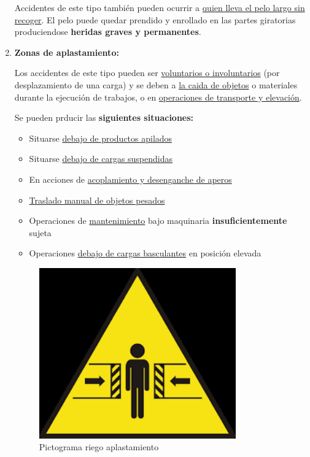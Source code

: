 \documentclass[a4paper,12pt,oneside]{book}
\begin{document}
\begin{enumerate}
Accidentes de este tipo también pueden ocurrir a \uline{quien lleva el pelo largo sin
recoger}. El pelo puede quedar prendido y enrollado en las partes giratorias
produciendose \textbf{heridas graves y permanentes}.

\item \textbf{Zonas de aplastamiento:}
\label{sec:orgdf52b36}

Los accidentes de este tipo pueden ser \uline{voluntarios o involuntarios} (por
desplazamiento de una carga) y se deben a \uline{la caida de objetos} o materiales
durante la ejecución de trabajos, o en \uline{operaciones de transporte y elevación}.

Se pueden prducir las \textbf{siguientes situaciones:}
\begin{itemize}
\item Situarse \uline{debajo de productos apilados}
\item Situarse \uline{debajo de cargas suspendidas}
\item En acciones de \uline{acoplamiento y desenganche de aperos}
\item \uline{Traslado manual de objetos pesados}
\item Operaciones de \uline{mantenimiento} bajo maquinaria \textbf{insuficientemente} sujeta
\item Operaciones \uline{debajo de cargas basculantes} en posición elevada
\end{itemize}

\begin{figure}[htbp]
\centering
\includegraphics[width=0.8\textwidth]{./img_0009/aplastamiento.png}
\caption{Pictograma riego aplastamiento}
\end{figure}


\end{enumerate}
\end{document}
